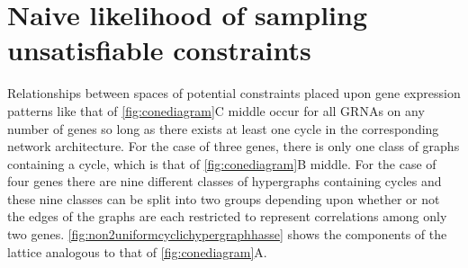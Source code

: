 \section{Naive likelihood of sampling unsatisfiable constraints}\label{sec:volrat}
Relationships between spaces of potential constraints placed upon gene expression patterns like that of \ref{fig:conediagram}C middle occur for all GRNAs on any number of genes so long as there exists at least one cycle in the corresponding network architecture. For the case of three genes, there is only one class of graphs containing a cycle, which is that of \ref{fig:conediagram}B middle. For the case of four genes there are nine different classes of hypergraphs containing cycles and these nine classes can be split into two groups depending upon whether or not the edges of the graphs are each restricted to represent correlations among only two genes. \ref{fig:non2uniformcyclichypergraphhasse} shows the components of the lattice analogous to that of \ref{fig:conediagram}A.

